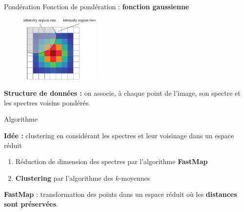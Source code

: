 \documentclass[10pt]{beamer}
\begin{document}

\begin{frame}{Pondération}
  Fonction de pondération : \textbf{fonction gaussienne}

  \begin{figure}[ht]
    \centering
    \includegraphics[width=0.35\textwidth]{fig/weights_gauss}
  \end{figure}

  \textbf{Structure de données :} on associe, à chaque point de l'image, son spectre et les spectres voisins pondérés.

\end{frame}


\begin{frame}{Algorithme}
  

  \textbf{Idée :} clustering en considérant les spectres et leur voisinage dans un espace réduit
  \begin{enumerate}
  \item Réduction de dimension des spectres par l'algorithme \textbf{FastMap}
  \item \textbf{Clustering} par l'algorithme des $k$-moyennes
  \end{enumerate}

\vspace{0.4cm}  

\textbf{FastMap} \cite{Faloutsos_1995} : transformation des points dans un espace réduit où les \textbf{distances sont préservées}.


\end{frame}
\end{document}
